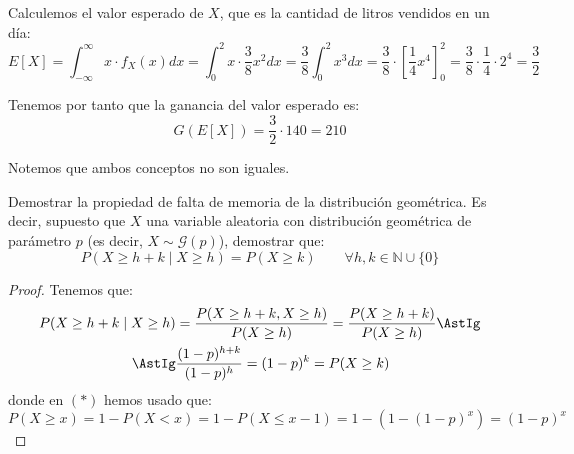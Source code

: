 \begin{ejercicio}
\begin{observacion}
        Calculemos el valor esperado de $X$, que es la cantidad de litros vendidos en un día:
        \begin{equation*}
            E[X] = \int_{-\infty}^{\infty}x\cdot f_X(x)dx = \int_{0}^{2}x\cdot \frac{3}{8}x^2dx = \frac{3}{8}\int_{0}^{2}x^3dx = \frac{3}{8}\cdot \left[\frac{1}{4}x^4\right]_{0}^{2} = \frac{3}{8}\cdot \frac{1}{4}\cdot 2^4 = \dfrac{3}{2}
        \end{equation*}

        Tenemos por tanto que la ganancia del valor esperado es:
        \begin{equation*}
            G(E[X]) = \dfrac{3}{2}\cdot 140 = 210
        \end{equation*}

        Notemos que ambos conceptos no son iguales.
    \end{observacion}
\end{ejercicio}


\begin{ejercicio}
    Demostrar la propiedad de falta de memoria de la distribución geométrica. Es decir, supuesto que $X$ una variable aleatoria con distribución geométrica de parámetro $p$ (es decir, $X \sim \mathcal{G}(p)$), demostrar que:
    \begin{equation*}
        P(X\geq h + k \mid X\geq h) = P(X\geq k) \qquad \forall h,k \in \mathbb{N}\cup \{0\}
    \end{equation*}
    \begin{proof}
        Tenemos que:
        \begin{align*}
            P(X\geq h + k \mid X\geq h) &= \frac{P(X\geq h+k, X\geq h)}{P(X\geq h)} = \frac{P(X\geq h+k)}{P(X\geq h)} \AstIg\\
            \AstIg & \dfrac{(1-p)^{h+k}}{(1-p)^h} = (1-p)^k = P(X\geq k)
        \end{align*}
        donde en $(\ast)$ hemos usado que:
        \begin{equation*}
            P(X\geq x) = 1-P(X<x) = 1-P(X\leq x-1) = 1-(1-(1-p)^x) = (1-p)^x
        \end{equation*}
    \end{proof}
\end{ejercicio}